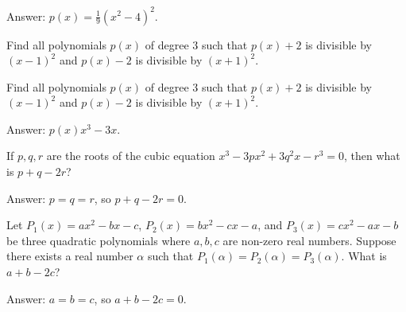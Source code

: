 \begin{solution}[name=Solution by Parviz Shahriari]
Answer: $\displaystyle p(x)=\frac{1}{9}(x^2-4)^2$.
\end{solution}


\begin{tcolorbox}
\begin{question}
Find all polynomials $p(x)$ of degree $3$ such that $p(x)+2$ is divisible by $(x-1)^2$ and $p(x)-2$ is divisible by $(x+1)^2$.
\end{question}
\end{tcolorbox}



\begin{tcolorbox}
\begin{question}
Find all polynomials $p(x)$ of degree $3$ such that $p(x)+2$ is divisible by $(x-1)^2$ and $p(x)-2$ is divisible by $(x+1)^2$.
\end{question}
\end{tcolorbox}


\begin{solution}[name=Solution by Parviz Shahriari]
Answer: $\displaystyle p(x)x^3-3x$.
\end{solution}


\begin{tcolorbox}
\begin{question}
If $p,q,r$ are the roots of the cubic equation $x^3-3px^2+3q^2x-r^3=0$, then what is $p+q-2r$?
\end{question}
\end{tcolorbox}


\begin{solution}[name=Solution by Problem Premier for the Olympiad]
Answer: $p=q=r$, so $p+q-2r=0$.
\end{solution}


\begin{tcolorbox}
\begin{question}
Let $P_1(x)=ax^2-bx-c$, $P_2(x)=bx^2-cx-a$, and $P_3(x)=cx^2-ax-b$ be three quadratic polynomials where $a,b,c$ are non-zero real numbers. Suppose there exists a real number $\alpha$ such that $P_1(\alpha)=P_2(\alpha)=P_3(\alpha)$. What is $a+b-2c$?
\end{question}
\end{tcolorbox}


\begin{solution}[name=Solution by Regional Math Olympiad 2010]
Answer: $a=b=c$, so $a+b-2c=0$.
\end{solution}



